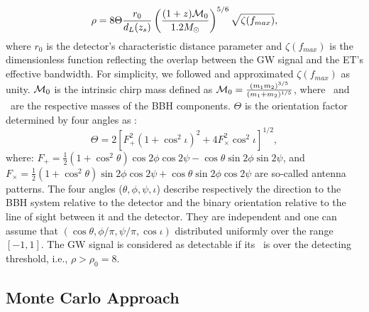 \documentclass[twocolumn]{aastex62}
\begin{document}
\begin{equation} \label{SNR}
\rho = 8 \Theta \frac{r_0}{d_L(z_s)} \left( \frac{(1+z){\cal M}_0}{1.2 M_{\odot}} \right)^{5/6}
\sqrt {\zeta(f_{max})},
\end{equation}
where $r_0$ is the detector's characteristic distance parameter and $\zeta(f_{max})$ is the dimensionless function reflecting the overlap between the GW signal and the ET's effective bandwidth. For simplicity, we followed  \citet{Taylor2012} and approximated $\zeta(f_{max})$ as unity. ${\cal M}_0$ is the intrinsic chirp mass defined as $ {\cal M}_0 = \frac{(m_1m_2)^{3/5}}{(m_1+m_2)^{1/5}}$, where \mone\ and \mtwo\ are the
respective masses of the BBH components. $\Theta$ is the orientation factor determined by four angles as \citep{Finn93}:
 \begin{equation} \label{Theta}
 \Theta = 2 [ F_{+}^2(1 + \cos^2{\iota} )^2 + 4 F_{\times}^2 \cos^2{\iota} ]^{1/2},
 \end{equation}
where: $F_{+} = \frac{1}{2} (1 + \cos^2{\theta}) \cos{2\phi} \cos{2 \psi} - \cos{\theta} \sin{2 \phi} \sin{ 2 \psi}$, and
$F_{\times} = \frac{1}{2} (1 + \cos^2{\theta}) \sin{2\phi} \cos{2 \psi} + \cos{\theta} \sin{2 \phi} \cos{ 2 \psi}$ are so-called antenna patterns. The four angles ($\theta, \phi, \psi, \iota$) describe respectively the
direction to the BBH system relative to the detector and the binary orientation relative to the line of sight between it and the detector. 
They are independent and one can assume that $(\cos\theta, \phi/\pi, \psi/\pi, \cos\iota)$ distributed uniformly over the range $[-1, 1]$. The GW signal is considered as detectable if its \snr\ is over the detecting threshold, i.e., $\rho > \rho_0 = 8$.

\subsection{Monte Carlo Approach} \label{MC}
\end{document}
